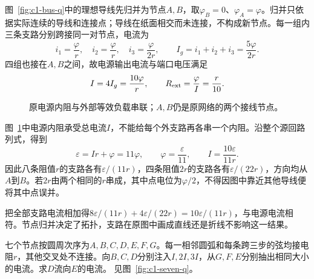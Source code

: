 \begin{solution}
图~\ref{fig:c1-bus-q}中的理想导线先归并为节点$A,B$，取$\varphi_B=0$、$\varphi_A=\varphi$。归并只依据实际连续的导线和连接点；导线在纸面相交而未连接，不构成新节点。每一组内三条支路分别跨接同一对节点，电流为
\[
 i_1=\frac\varphi r,\quad i_2=\frac\varphi r,\quad
 i_3=\frac\varphi{2r},\qquad I_g=i_1+i_2+i_3=\frac{5\varphi}{2r}.
\]
四组也接在$A,B$之间，故电源输出电流与端口电压满足
\[
 I=4I_g=\frac{10\varphi}r,\qquad R_{\rm ext}=\frac\varphi I=\frac r{10}.
\]
\begin{figure}[H]\centering
{}
\caption{原电源内阻与外部等效负载串联；$A,B$仍是原网络的两个接线节点。}\label{fig:c1-bus-s}
\end{figure}
图~\ref{fig:c1-bus-s}中电源内阻承受总电流$I$，不能给每个外支路再各串一个内阻。沿整个源回路列式，得到
\[
 \varepsilon=Ir+\varphi=11\varphi,\qquad
 \boxed{\varphi=\frac\varepsilon{11}},\qquad
 \boxed{I=\frac{10\varepsilon}{11r}}.
\]
因此八条阻值$r$的支路各有$\varepsilon/(11r)$，四条阻值$2r$的支路各有$\varepsilon/(22r)$，方向均从$A$到$B$。若$2r$由两个相同的$r$串成，其中点电位为$\varphi/2$，不得因图中靠近其他导线便将其中点误并。

把全部支路电流相加得$8\varepsilon/(11r)+4\varepsilon/(22r)=10\varepsilon/(11r)$，与电源电流相符。节点归并决定了拓扑，支路在原图中画成直线还是折线不影响这一结果。
\end{solution}

\begin{example}[七边形网络中的多端注流]\label{ex:c1-seven}
七个节点按圆周次序为$A,B,C,D,E,F,G$。每一相邻圆弧和每条跨三步的弦均接电阻$r$，其他交叉处不连接。向$B,C,D$分别注入$I,2I,3I$，从$G,F,E$分别抽出相同大小的电流。求$D$流向$E$的电流。 见图~\ref{fig:c1-seven-q}。
\end{example}

